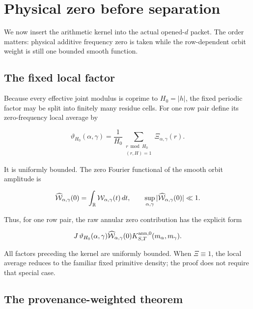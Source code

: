 \section{Physical zero before separation}
\label{sec:tpc26-physical-zero}

We now insert the arithmetic kernel into the actual opened-\(d\)
packet.  The order matters: physical additive frequency zero is taken
while the row-dependent orbit weight is still one bounded smooth
function.

\subsection{The fixed local factor}

Because every effective joint modulus is coprime to \(H_0=|h|\), the
fixed periodic factor may be split into finitely many residue cells.
For one row pair define its zero-frequency local average by

\begin{equation}
 \vartheta_{H_0}(\alpha,\gamma)
 =\frac1{H_0}
 \sum_{\substack{r\bmod H_0\\(r,H)=1}}
 \Xi_{\alpha,\gamma}(r).
 \label{eq:tpc26-local-average}
\end{equation}

It is uniformly bounded.  The zero Fourier functional of the smooth
orbit amplitude is

\begin{equation}
 \widehat{\mathcal W}_{\alpha,\gamma}(0)
 =\int_{\mathbb R}\mathcal W_{\alpha,\gamma}(t)\,dt,
 \qquad
 \sup_{\alpha,\gamma}
 |\widehat{\mathcal W}_{\alpha,\gamma}(0)|\ll1.
 \label{eq:tpc26-row-zero-integral}
\end{equation}

Thus, for one row pair, the raw annular zero contribution has the
explicit form

\begin{equation}
 J\,\vartheta_{H_0}(\alpha,\gamma)
 \widehat{\mathcal W}_{\alpha,\gamma}(0)
 K^{\rm ann,0}_{S,T}(m_\alpha,m_\gamma).
 \label{eq:tpc26-one-pair-physical-zero}
\end{equation}

All factors preceding the kernel are uniformly bounded.  When
\(\Xi\equiv1\), the local average reduces to the familiar fixed
primitive density; the proof does not require that special case.

\subsection{The provenance-weighted theorem}

